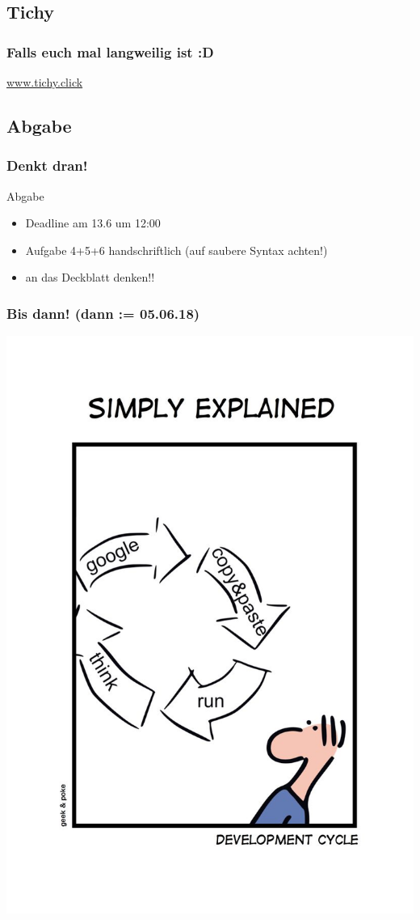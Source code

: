 \documentclass[18pt]{beamer}
\begin{document}
	\subsection{Tichy}
	\begin{frame}
		\frametitle{Falls euch mal langweilig ist :D}
		\centering \url{www.tichy.click}
	\end{frame}
	
	\subsection{Abgabe}
	\begin{frame}
		\frametitle{Denkt dran!}
		\begin{alertblock}{Abgabe}
			\begin{itemize}
				\item Deadline am 13.6 um 12:00
				\item Aufgabe 4+5+6 handschriftlich (auf saubere Syntax achten!)
				\item an das Deckblatt denken!!
			\end{itemize}
		\end{alertblock}
	\end{frame}
		
	\begin{frame}
		\frametitle{Bis dann! (dann := 05.06.18)}
		\centering
		\includegraphics[scale=0.9]{./comics/geek_and_poke_development.jpg}
	\end{frame}
\end{document}
